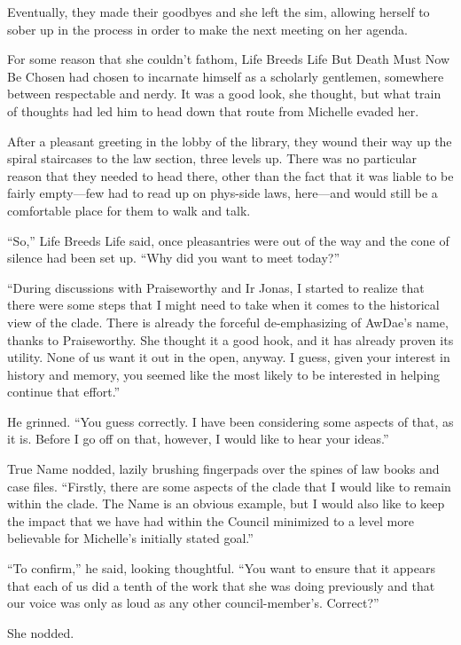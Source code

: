 Eventually, they made their goodbyes and she left the sim, allowing herself to sober up in the process in order to make the next meeting on her agenda.

For some reason that she couldn't fathom, Life Breeds Life But Death Must Now Be Chosen had chosen to incarnate himself as a scholarly gentlemen, somewhere between respectable and nerdy. It was a good look, she thought, but what train of thoughts had led him to head down that route from Michelle evaded her.

After a pleasant greeting in the lobby of the library, they wound their way up the spiral staircases to the law section, three levels up. There was no particular reason that they needed to head there, other than the fact that it was liable to be fairly empty---few had to read up on phys-side laws, here---and would still be a comfortable place for them to walk and talk.

``So,'' Life Breeds Life said, once pleasantries were out of the way and the cone of silence had been set up. ``Why did you want to meet today?''

``During discussions with Praiseworthy and Ir Jonas, I started to realize that there were some steps that I might need to take when it comes to the historical view of the clade. There is already the forceful de-emphasizing of AwDae's name, thanks to Praiseworthy. She thought it a good hook, and it has already proven its utility. None of us want it out in the open, anyway. I guess, given your interest in history and memory, you seemed like the most likely to be interested in helping continue that effort.''

He grinned. ``You guess correctly. I have been considering some aspects of that, as it is. Before I go off on that, however, I would like to hear your ideas.''

True Name nodded, lazily brushing fingerpads over the spines of law books and case files. ``Firstly, there are some aspects of the clade that I would like to remain within the clade. The Name is an obvious example, but I would also like to keep the impact that we have had within the Council minimized to a level more believable for Michelle's initially stated goal.''

``To confirm,'' he said, looking thoughtful. ``You want to ensure that it appears that each of us did a tenth of the work that she was doing previously and that our voice was only as loud as any other council-member's. Correct?''

She nodded.

